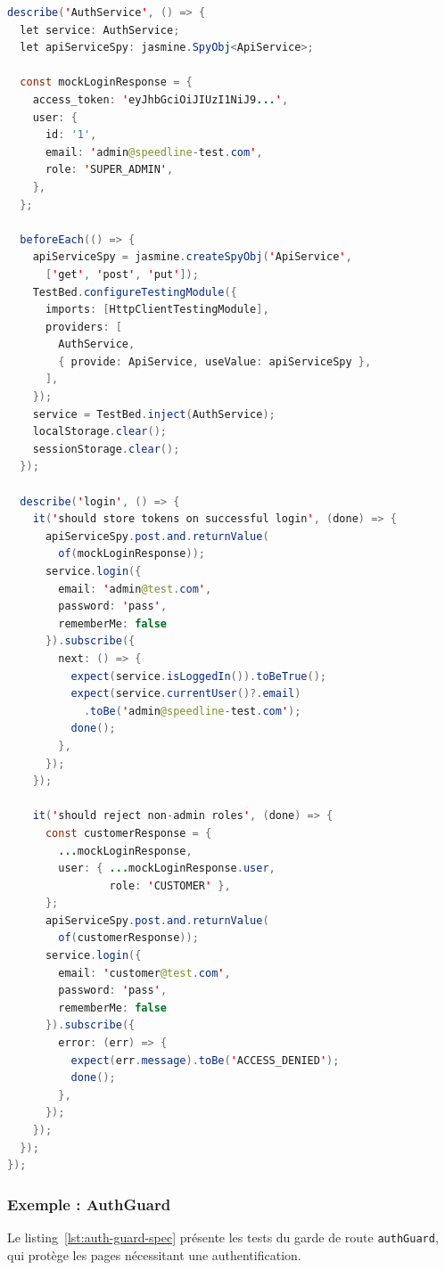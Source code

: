 \begin{lstlisting}[language=Java, caption={Test du service d'authentification Angular -- auth.service.spec.ts}, label={lst:auth-service-spec}]
describe('AuthService', () => {
  let service: AuthService;
  let apiServiceSpy: jasmine.SpyObj<ApiService>;

  const mockLoginResponse = {
    access_token: 'eyJhbGciOiJIUzI1NiJ9...',
    user: {
      id: '1',
      email: 'admin@speedline-test.com',
      role: 'SUPER_ADMIN',
    },
  };

  beforeEach(() => {
    apiServiceSpy = jasmine.createSpyObj('ApiService',
      ['get', 'post', 'put']);
    TestBed.configureTestingModule({
      imports: [HttpClientTestingModule],
      providers: [
        AuthService,
        { provide: ApiService, useValue: apiServiceSpy },
      ],
    });
    service = TestBed.inject(AuthService);
    localStorage.clear();
    sessionStorage.clear();
  });

  describe('login', () => {
    it('should store tokens on successful login', (done) => {
      apiServiceSpy.post.and.returnValue(
        of(mockLoginResponse));
      service.login({
        email: 'admin@test.com',
        password: 'pass',
        rememberMe: false
      }).subscribe({
        next: () => {
          expect(service.isLoggedIn()).toBeTrue();
          expect(service.currentUser()?.email)
            .toBe('admin@speedline-test.com');
          done();
        },
      });
    });

    it('should reject non-admin roles', (done) => {
      const customerResponse = {
        ...mockLoginResponse,
        user: { ...mockLoginResponse.user,
                role: 'CUSTOMER' },
      };
      apiServiceSpy.post.and.returnValue(
        of(customerResponse));
      service.login({
        email: 'customer@test.com',
        password: 'pass',
        rememberMe: false
      }).subscribe({
        error: (err) => {
          expect(err.message).toBe('ACCESS_DENIED');
          done();
        },
      });
    });
  });
});
\end{lstlisting}

\subsubsection{Exemple : AuthGuard}

Le listing~\ref{lst:auth-guard-spec} présente les tests du garde de route
\texttt{authGuard}, qui protège les pages nécessitant une authentification.


